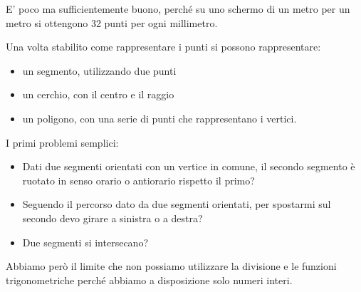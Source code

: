 E' poco ma sufficientemente buono, perché su uno schermo di un metro per un metro si ottengono 32 punti per ogni millimetro.

Una volta stabilito come rappresentare i punti si possono rappresentare:

\begin{itemize}
\item
  un segmento, utilizzando due punti
\item
  un cerchio, con il centro e il raggio
\item
  un poligono, con una serie di punti che rappresentano i vertici.
\end{itemize}

I primi problemi semplici:

\begin{itemize}
\item
  Dati due segmenti orientati con un vertice in comune, il secondo segmento è ruotato in senso orario o antiorario rispetto il primo?
\item
  Seguendo il percorso dato da due segmenti orientati, per spostarmi sul secondo devo girare a sinistra o a destra?
\item
  Due segmenti si intersecano?
\end{itemize}

Abbiamo però il limite che non possiamo utilizzare la divisione e le funzioni trigonometriche perché abbiamo a disposizione solo numeri interi.
